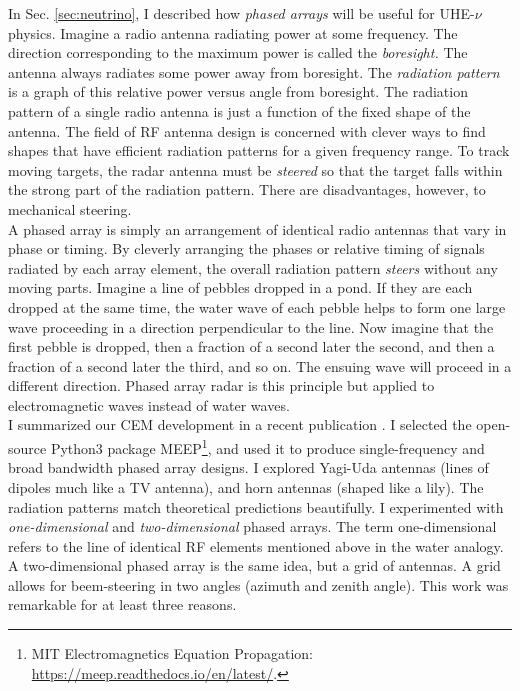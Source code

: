 \documentclass[../../../main.tex]{subfiles}
\begin{document}
In Sec. \ref{sec:neutrino}, I described how \textit{phased arrays} will be useful for UHE-$\nu$ physics.  Imagine a radio antenna radiating power at some frequency.  The direction corresponding to the maximum power is called the \textit{boresight.}  The antenna always radiates some power away from boresight.  The \textit{radiation pattern} is a graph of this relative power versus angle from boresight.  The radiation pattern of a single radio antenna is just a function of the fixed shape of the antenna.  The field of RF antenna design is concerned with clever ways to find shapes that have efficient radiation patterns for a given frequency range.  To track moving targets, the radar antenna must be \textit{steered} so that the target falls within the strong part of the radiation pattern.  There are disadvantages, however, to mechanical steering.
\\
\vspace{0.25cm}
A phased array is simply an arrangement of identical radio antennas that vary in phase or timing.  By cleverly arranging the phases or relative timing of signals radiated by each array element, the overall radiation pattern \textit{steers} without any moving parts.  Imagine a line of pebbles dropped in a pond.  If they are each dropped at the same time, the water wave of each pebble helps to form one large wave proceeding in a direction perpendicular to the line.  Now imagine that the first pebble is dropped, then a fraction of a second later the second, and then a fraction of a second later the third, and so on.  The ensuing wave will proceed in a different direction.  Phased array radar is this principle but applied to electromagnetic waves instead of water waves.
\\
\vspace{0.25cm}
I summarized our CEM development in a recent publication \cite{electronics10040415}.  I selected the open-source Python3 package MEEP\footnote{MIT Electromagnetics Equation Propagation: \url{https://meep.readthedocs.io/en/latest/}.}, and used it to produce single-frequency and broad bandwidth phased array designs.  I explored Yagi-Uda antennas (lines of dipoles much like a TV antenna), and horn antennas (shaped like a lily).  The radiation patterns match theoretical predictions beautifully.  I experimented with \textit{one-dimensional} and \textit{two-dimensional} phased arrays.  The term one-dimensional refers to the line of identical RF elements mentioned above in the water analogy.  A two-dimensional phased array is the same idea, but a grid of antennas.  A grid allows for beem-steering in two angles (azimuth and zenith angle).  This work was remarkable for at least three reasons.
\end{document}
